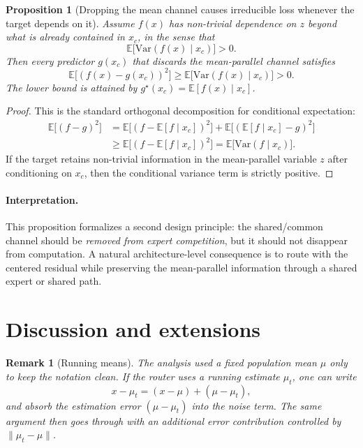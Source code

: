 \documentclass[11pt]{article}
\newtheorem{proposition}{Proposition}
\newtheorem{remark}{Remark}
\begin{document}
\begin{proposition}[Dropping the mean channel causes irreducible loss whenever the target depends on it]
Assume $f(x)$ has non-trivial dependence on $z$ beyond what is already contained in $x_c$, in the sense that
\begin{equation}
    \mathbb E\bigl[\mathrm{Var}(f(x)\mid x_c)\bigr] > 0.
\end{equation}
Then every predictor $g(x_c)$ that discards the mean-parallel channel satisfies
\begin{equation}
    \mathbb E\bigl[(f(x)-g(x_c))^2\bigr]
    \ge
    \mathbb E\bigl[\mathrm{Var}(f(x)\mid x_c)\bigr]
    > 0.
\end{equation}
The lower bound is attained by $g^\star(x_c)=\mathbb E[f(x)\mid x_c]$.
\end{proposition}

\begin{proof}
This is the standard orthogonal decomposition for conditional expectation:
\begin{align}
    \mathbb E\bigl[(f-g)^2\bigr]
    &= \mathbb E\bigl[(f-\mathbb E[f\mid x_c])^2\bigr]
      + \mathbb E\bigl[(\mathbb E[f\mid x_c]-g)^2\bigr] \\
    &\ge \mathbb E\bigl[(f-\mathbb E[f\mid x_c])^2\bigr]
     = \mathbb E\bigl[\mathrm{Var}(f\mid x_c)\bigr].
\end{align}
If the target retains non-trivial information in the mean-parallel variable $z$ after conditioning on $x_c$, then the conditional variance term is strictly positive.
\end{proof}

\paragraph{Interpretation.}
This proposition formalizes a second design principle: the shared/common channel should be \emph{removed from expert competition}, but it should not disappear from computation. A natural architecture-level consequence is to route with the centered residual while preserving the mean-parallel information through a shared expert or shared path.

\section{Discussion and extensions}

\begin{remark}[Running means]
The analysis used a fixed population mean $\mu$ only to keep the notation clean. If the router uses a running estimate $\mu_t$, one can write
\begin{equation}
    x-\mu_t = (x-\mu) + (\mu-\mu_t),
\end{equation}
and absorb the estimation error $(\mu-\mu_t)$ into the noise term. The same argument then goes through with an additional error contribution controlled by $\|\mu_t-\mu\|$.
\end{remark}
\end{document}
